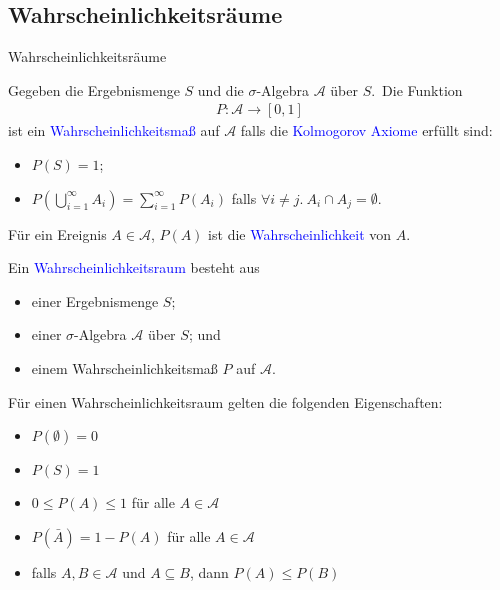 \documentclass{beamer}
\def\b{\textcolor{blue}}
\begin{document}
\subsection{Wahrscheinlichkeitsräume}
\begin{frame}{Wahrscheinlichkeitsräume}
    \begin{definition}
        Gegeben die Ergebnismenge $S$ und die $\sigma$-Algebra $\mathcal{A}$ über $S$.\pause\ Die Funktion
        \begin{align*}
            P: \mathcal{A} \to [0,1]
        \end{align*}
        ist ein \b{Wahrscheinlichkeitsmaß} auf $\mathcal{A}$ falls die \b{Kolmogorov Axiome} erfüllt sind:
        \begin{itemize}\pause
            \item $P(S) = 1$;\pause
            \item $P(\bigcup_{i=1}^{\infty} A_i) = \sum_{i=1}^{\infty} P(A_i)$ falls $\forall i \neq j.\ A_i \cap A_j = \emptyset$.
        \end{itemize}
    \end{definition}
\end{frame}

\begin{frame}
    \begin{definition}
        Für ein Ereignis $A \in \mathcal{A}$, $P(A)$ ist die \b{Wahrscheinlichkeit} von $A$.
    \end{definition}\pause
    \begin{definition}
        Ein \b{Wahrscheinlichkeitsraum} besteht aus
        \begin{itemize}
            \item einer Ergebnismenge $S$;
            \item einer $\sigma$-Algebra $\mathcal{A}$ über $S$; und
            \item einem Wahrscheinlichkeitsmaß $P$ auf $\mathcal{A}$.
        \end{itemize}
    \end{definition}
\end{frame}

\begin{frame}
    Für einen Wahrscheinlichkeitsraum gelten die folgenden Eigenschaften:\pause
    \begin{itemize}
        \item $P(\emptyset) = 0$\pause
        \item $P(S) = 1$\pause
        \item $0 \leq P(A) \leq 1$ für alle $A \in \mathcal{A}$\pause
        \item $P(\bar{A}) = 1 - P(A)$ für alle $A \in \mathcal{A}$\pause
        \item falls $A, B \in \mathcal{A}$ und $A \subseteq B$, dann $P(A) \leq P(B)$
    \end{itemize}
\end{frame}
\end{document}
